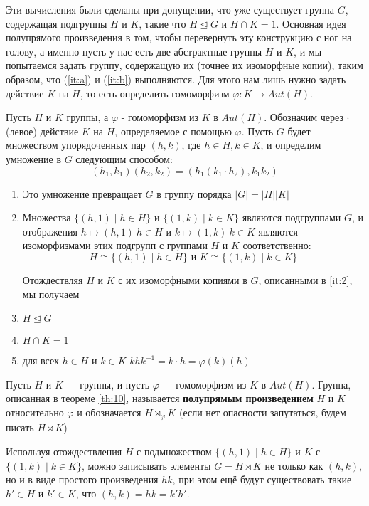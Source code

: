 Эти вычисления были сделаны при допущении, что уже существует группа $G$, содержащая подгруппы $H$ и $K$, такие что $H \unlhd G$ и $H \cap K = 1$. Основная идея полупрямого произведения в том, чтобы перевернуть эту конструкцию с ног на голову, а именно пусть у нас есть две абстрактные группы $H$ и $K$, и мы попытаемся задать группу, содержащую их (точнее их изоморфные копии), таким образом, что (\ref{it:a}) и (\ref{it:b}) выполняются. Для этого нам лишь нужно задать действие $K$ на $H$, то есть определить гомоморфизм $\varphi:K \rightarrow Aut(H)$.

\begin{theorem}\label{th:10} \cite[176]{Dummit99}
  Пусть $H$ и $K$ группы, а $\varphi$ - гомоморфизм из $K$ в $Aut(H)$. Обозначим через $ \cdot $ (левое) действие $K$ на $H$, определяемое с помощью $\varphi$. Пусть $G$ будет множеством упорядоченных пар $(h,k)$, где $ h \in H, k \in K$, и определим умножение в $G$ следующим способом:
  \[
  	(h_1, k_1)(h_2, k_2)=(h_1 (k_1 \cdot h_2), k_1 k_2)
  \]
  \begin{enumerate}[(1)]
    \item Это умножение превращает $G$ в группу порядка $|G|=|H| |K|$
    \item Множества $\{(h,1) \mid h \in H\}$ и $\{(1,k) \mid k \in K\}$ являются подгруппами $G$, и отображения $h \mapsto (h,1)\ h \in H$ и  $k \mapsto (1,k)\ k \in K$ являются изоморфизмами этих подгрупп с группами $H$ и $K$ соответственно:
   \[
   	H \cong \{(h,1) \mid h \in H\} \mbox{ и } K \cong \{(1,k) \mid k \in K\}
   \] \label{it:2}
   
   Отождествляя $H$ и $K$ с их изоморфными копиями в $G$, описанными в \ref{it:2}, мы получаем
   \item $H \unlhd G$
   \item $H \cap K = 1$
   \item для всех $h \in H$ и $k \in K$ $khk^{-1}=k \cdot h= \varphi(k)(h)$
  \end{enumerate}
\end{theorem}

\begin{definition}
  Пусть $H$ и $K$ --- группы, и пусть $\varphi$ --- гомоморфизм из $K$ в $Aut(H)$. Группа, описанная в теореме \ref{th:10}, называется \textbf{полупрямым произведением} $H$ и $K$ относительно $\varphi$ и обозначается $H \rtimes_{\varphi} K$ (если нет опасности запутаться, будем писать $H \rtimes K$)
\end{definition}

Используя отождествления $H$ с подмножеством $\{(h,1) \mid h \in H\}$ и $K$ с $\{(1,k) \mid k \in K\}$, можно записывать элементы $G = H \rtimes K$ не только как $(h, k)$, но и в виде простого произведения $hk$, при этом ещё будут существовать такие $h' \in H$ и $k' \in K$, что $(h, k) = hk = k' h'$. 


